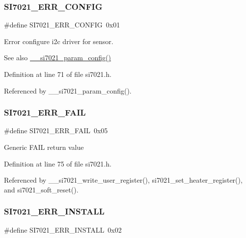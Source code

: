 \subsubsection{\texorpdfstring{S\+I7021\+\_\+\+E\+R\+R\+\_\+\+C\+O\+N\+F\+IG}{SI7021\_ERR\_CONFIG}}
{\footnotesize\ttfamily \#define S\+I7021\+\_\+\+E\+R\+R\+\_\+\+C\+O\+N\+F\+IG~0x01}

Error configure i2c driver for sensor. \begin{DoxySeeAlso}{See also}
\hyperlink{si7021_8h_a339f08aa1ed1d74c2c12fd904ea4e28c}{\+\_\+\+\_\+si7021\+\_\+param\+\_\+config()} 
\end{DoxySeeAlso}


Definition at line 71 of file si7021.\+h.



Referenced by \+\_\+\+\_\+si7021\+\_\+param\+\_\+config().

\mbox{\label{group__SI7021__RT__VALUE_ga7cc0cccf705f1f1807d09abc3d1bea14}} 
\subsubsection{\texorpdfstring{S\+I7021\+\_\+\+E\+R\+R\+\_\+\+F\+A\+IL}{SI7021\_ERR\_FAIL}}
{\footnotesize\ttfamily \#define S\+I7021\+\_\+\+E\+R\+R\+\_\+\+F\+A\+IL~0x05}

Generic F\+A\+IL return value 

Definition at line 75 of file si7021.\+h.



Referenced by \+\_\+\+\_\+si7021\+\_\+write\+\_\+user\+\_\+register(), si7021\+\_\+set\+\_\+heater\+\_\+register(), and si7021\+\_\+soft\+\_\+reset().

\mbox{\label{group__SI7021__RT__VALUE_ga1a536c4aff63acd66547e006b587841b}} 
\subsubsection{\texorpdfstring{S\+I7021\+\_\+\+E\+R\+R\+\_\+\+I\+N\+S\+T\+A\+LL}{SI7021\_ERR\_INSTALL}}
{\footnotesize\ttfamily \#define S\+I7021\+\_\+\+E\+R\+R\+\_\+\+I\+N\+S\+T\+A\+LL~0x02}

